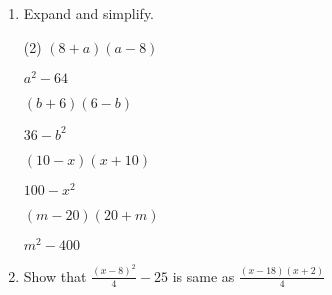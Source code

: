 \begin{enumerate} [leftmargin=0cm]
\item Expand and simplify.
\begin{tasks}[label=(\alph*), after-item-skip=2pt,after-skip=3pt, label-width=4ex](2)
    \task  $ ( 8+ a) (a-8)                 $    \\  \begin{envAnswer} $   a^2   -   64        $ \end{envAnswer}
    \task  $ ( b+ 6) (6-b)                 $    \\  \begin{envAnswer} $   36    -   b^2       $ \end{envAnswer}
    \task  $ (10-x ) (x+10)                $    \\  \begin{envAnswer} $   100   -   x^2       $ \end{envAnswer}
    \task  $ ( m-20) (20+m)                $    \\  \begin{envAnswer} $   m^2   -   400       $ \end{envAnswer}

\end{tasks}


\item Show that $\frac{(x-8)^2}{4}-25  $ is same as $\frac{(x-18)(x+2)}{4}$




\end{enumerate}
